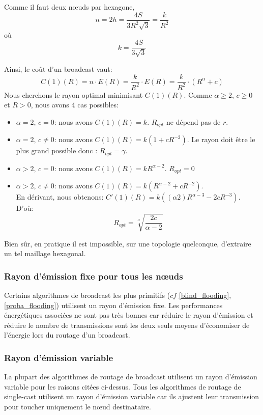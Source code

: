 Comme il faut deux nœuds par hexagone,
$$n=2h=\frac{4S}{3R^2 \sqrt{3}}= \frac{k}{R^2}$$ où $$k=\frac{4S}{3 \sqrt{3}}$$

Ainsi, le coût d'un broadcast vaut: $$C(1)(R)= n\cdot E(R)=\frac{k}{R^2}\cdot E(R)=\frac{k}{R^2}\cdot (R^\alpha+c)$$
Nous cherchons le rayon optimal minimisant $C(1)(R)$. Comme $\alpha\geq 2$, $c\geq 0$ et $R>0$, nous avons 4 cas possibles:
\begin{itemize}
 \item $\alpha=2$, $c=0$: nous avons $C(1)(R)=k$. $R_{opt}$ ne dépend pas de $r$.
 \item $\alpha=2$, $c\neq0$: nous avons $C(1)(R)=k(1+cR^{-2})$. Le rayon doit être le plus grand possible donc : $R_{opt}=\gamma$.
 \item $\alpha>2$, $c=0$: nous avons $C(1)(R)=kR^{\alpha-2}$. $R_{opt}=0$
 \item $\alpha>2$, $c\neq 0$: nous avons $C(1)(R)=k(R^{\alpha-2} + c R^{-2} ) $.\\
 En dérivant, nous obtenons: $C'(1)(R)= k( (\alpha 2) R^{\alpha-3}- 2cR^{-3} ) $.\\
D'où: $$R_{opt}=\sqrt[\alpha]{\frac{2c}{\alpha-2}}$$
\end{itemize}

Bien sûr, en pratique il est impossible, sur une topologie quelconque, d'extraire un tel maillage hexagonal.


\subsubsection{Rayon d'émission fixe pour tous les nœuds}
Certains algorithmes de broadcast les plus primitifs ($cf$ \ref{blind_flooding}, \ref{proba_flooding}) utilisent un rayon d'émission fixe. Les performances énergétiques associées ne sont pas très bonnes car réduire le rayon d'émission et réduire le nombre de transmissions sont les deux seuls moyens d'économiser de l'énergie lors du routage d'un broadcast.


\subsubsection{Rayon d'émission variable}
La plupart des algorithmes de routage de broadcast utilisent un rayon d'émission variable pour les raisons citées ci-dessus. Tous les algorithmes de routage de single-cast utilisent un rayon d'émission variable car ils ajustent leur transmission pour toucher uniquement le nœud destinataire.



